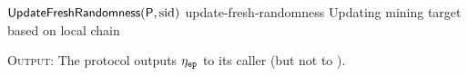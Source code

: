 \begin{cccProtocol}
    {$\textsf{UpdateFreshRandomness}(\mathsf{P}, \mathrm{sid})$}
    {update-fresh-randomness}
    {Updating mining target based on local chain}

    \begin{algorithmic}[1]
    \end{algorithmic}

    \textsc{Output}: The protocol outputs $\eta_\mathtt{ep}$ to its caller (but not to \Z).
\end{cccProtocol}